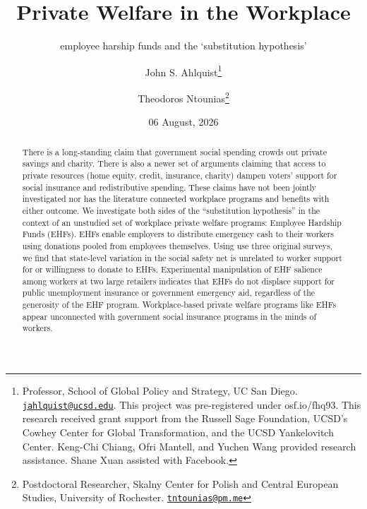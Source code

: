 \documentclass[
  11pt,
  oneside]{article}
\title{Private Welfare in the Workplace}
\subtitle{employee harship funds and the `substitution hypothesis'}
\author{John S. Ahlquist\footnote{Professor, School of Global Policy and Strategy, UC San Diego. \href{mailto:jahlquist@ucsd.edu}{\nolinkurl{jahlquist@ucsd.edu}}. This project was pre-registered under osf.io/fhq93. This research received grant support from the Russell Sage Foundation, UCSD's Cowhey Center for Global Transformation, and the UCSD Yankelovitch Center. Keng-Chi Chiang, Ofri Mantell, and Yuchen Wang provided research assistance. Shane Xuan assisted with Facebook.} \and Theodoros Ntounias\footnote{Postdoctoral Researcher, Skalny Center for Polish and Central European Studies, University of Rochester. \href{mailto:tntounias@pm.me}{\nolinkurl{tntounias@pm.me}}}}
\date{06 August, 2026}
\begin{document}
\maketitle

\begin{abstract}
\begin{singlespace} 

There is a long-standing claim that government social spending crowds out private savings and charity. There is also a newer set of arguments claiming that access to private resources (home equity, credit, insurance, charity) dampen voters' support for social insurance and redistributive spending. These claims have not been jointly investigated nor has the literature connected workplace programs and benefits with either outcome.  We investigate both sides of the ``substitution hypothesis'' in the context of an unstudied set of workplace private welfare programs: Employee Hardship Funds (EHFs). EHFs enable employers to distribute emergency cash to their workers using donations pooled from employees themselves. Using use three original surveys, we find that state-level variation in the social safety net is unrelated to worker support for or willingness to donate to EHFs. Experimental manipulation of EHF salience among workers at two large retailers indicates that EHFs do not displace support for public unemployment insurance or government emergency aid, regardless of the generosity of the EHF program.  Workplace-based private welfare programs like EHFs appear unconnected with government social insurance programs in the minds of workers. \\


\end{singlespace}
\end{abstract}
\end{document}
